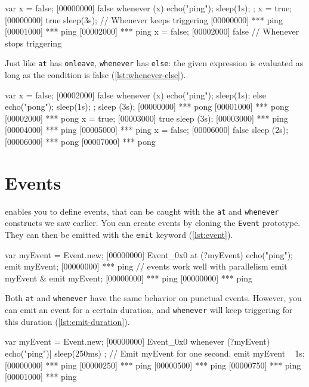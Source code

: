 \documentclass[openright,twoside,12pt]{report}
\begin{document}
\begin{urbiscript}[caption=Using \texttt{whenever}, label=lst:whenever]
var x = false;
[00000000] false
whenever (x)
{
  echo("ping");
  sleep(1s);
};
x = true;
[00000000] true
sleep(3s);
// Whenever keeps triggering
[00000000] *** ping
[00001000] *** ping
[00002000] *** ping
x = false;
[00002000] false
// Whenever stops triggering
\end{urbiscript}

Just like \lstinline|at| has \lstinline|onleave|, \lstinline|whenever|
has \lstinline|else|: the given expression is evaluated as long as the
condition is false (\autoref{lst:whenever-else}).

\begin{urbiscript}[caption=Using \texttt{whenever ... else},
  label=lst:whenever-else]
var x = false;
[00002000] false
whenever (x)
{
  echo("ping");
  sleep(1s);
}
else
{
  echo("pong");
  sleep(1s);
};
sleep (3s);
[00000000] *** pong
[00001000] *** pong
[00002000] *** pong
x = true;
[00003000] true
sleep (3s);
[00003000] *** ping
[00004000] *** ping
[00005000] *** ping
x = false;
[00006000] false
sleep (2s);
[00006000] *** pong
[00007000] *** pong
\end{urbiscript}

\section{Events}

\urbi enables you to define events, that can be caught with the
\lstinline|at| and \lstinline|whenever| constructs we saw earlier. You
can create events by cloning the \lstinline|Event| prototype. They can
then be emitted with the \lstinline|emit| keyword (\autoref{lst:event}).

\begin{urbiscript}[caption=Using events, label=lst:event]
var myEvent = Event.new;
[00000000] Event_0x0
at (?myEvent)
  echo("ping");
emit myEvent;
[00000000] *** ping
// events work well with parallelism
emit myEvent & emit myEvent;
[00000000] *** ping
[00000000] *** ping
\end{urbiscript}

Both \lstinline|at| and \lstinline|whenever| have the same behavior on
punctual events. However, you can emit an event for a certain
duration, and \lstinline|whenever| will keep triggering for this
duration (\autoref{lst:emit-duration}).

\begin{urbiscript}[caption=Emitting events with a duration,
  label=lst:emit-duration]
var myEvent = Event.new;
[00000000] Event_0x0
whenever (?myEvent)
{
  echo("ping")|
  sleep(250ms)
};
// Emit myEvent for one second.
emit myEvent ~ 1s;
[00000000] *** ping
[00000250] *** ping
[00000500] *** ping
[00000750] *** ping
[00001000] *** ping
\end{urbiscript}
\end{document}
